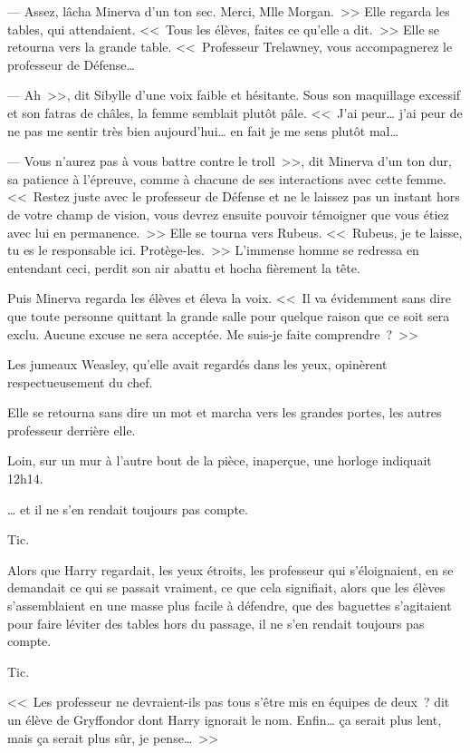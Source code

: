 --- Assez, lâcha Minerva d'un ton sec. Merci, Mlle Morgan.~>> Elle regarda les tables, qui attendaient. <<~Tous les élèves, faites ce qu'elle a dit.~>> Elle se retourna vers la grande table. <<~Professeur Trelawney, vous accompagnerez le professeur de Défense…

--- Ah~>>, dit Sibylle d'une voix faible et hésitante. Sous son maquillage excessif et son fatras de châles, la femme semblait plutôt pâle. <<~J'ai peur… j'ai peur de ne pas me sentir très bien aujourd'hui… en fait je me sens plutôt mal…

--- Vous n'aurez pas à vous battre contre le troll~>>, dit Minerva d'un ton dur, sa patience à l'épreuve, comme à chacune de ses interactions avec cette femme. <<~Restez juste avec le professeur de Défense et ne le laissez pas un instant hors de votre champ de vision, vous devrez ensuite pouvoir témoigner que vous étiez avec lui en permanence.~>> Elle se tourna vers Rubeus. <<~Rubeus, je te laisse, tu es le responsable ici. Protège-les.~>> L'immense homme se redressa en entendant ceci, perdit son air abattu et hocha fièrement la tête.

Puis Minerva regarda les élèves et éleva la voix. <<~Il va évidemment sans dire que toute personne quittant la grande salle pour quelque raison que ce soit sera exclu. Aucune excuse ne sera acceptée. Me suis-je faite comprendre~?~>>

Les jumeaux Weasley, qu'elle avait regardés dans les yeux, opinèrent respectueusement du chef.

Elle se retourna sans dire un mot et marcha vers les grandes portes, les autres professeur derrière elle.

Loin, sur un mur à l'autre bout de la pièce, inaperçue, une horloge indiquait 12h14.

… et il ne s'en rendait toujours pas compte.

Tic.

Alors que Harry regardait, les yeux étroits, les professeur qui s'éloignaient, en se demandait ce qui se passait vraiment, ce que cela signifiait, alors que les élèves s'assemblaient en une masse plus facile à défendre, que des baguettes s'agitaient pour faire léviter des tables hors du passage, il ne s'en rendait toujours pas compte.

Tic.

<<~Les professeur ne devraient-ils pas tous s'être mis en équipes de deux~? dit un élève de Gryffondor dont Harry ignorait le nom. Enfin… ça serait plus lent, mais ça serait plus sûr, je pense…~>>

